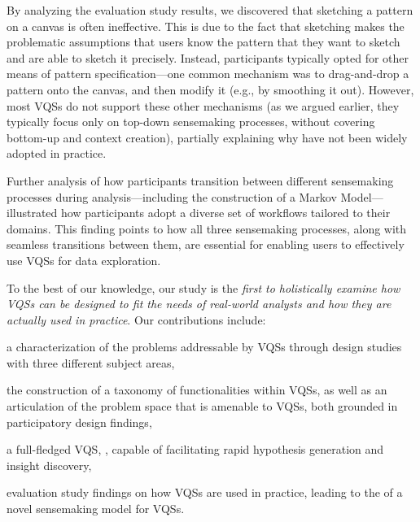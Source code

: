 \par By analyzing the evaluation study results, we discovered that sketching a pattern on a canvas is often ineffective. This is due to the fact that sketching makes the problematic assumptions that users know the pattern that they want to sketch and are able to sketch it precisely. Instead, participants typically opted for other means of pattern specification---one common mechanism was to drag-and-drop a  pattern onto the canvas, and then modify it (e.g., by smoothing it out). However, most VQSs do not support these other mechanisms (as we argued earlier, they typically focus only on top-down sensemaking processes, without covering bottom-up and context creation), partially explaining why  have not been widely adopted in practice.
\par Further analysis of how participants
transition between different sensemaking processes
during analysis---including the construction of a Markov Model---illustrated
how participants adopt a diverse set of workflows tailored
to their domains. %
This finding points to how all three sensemaking processes, along with seamless transitions between them, are essential for enabling users to effectively use VQSs for data exploration. 
\par To the best of our knowledge, our study is the \emph{first to holistically examine how VQSs can be designed to fit the needs of real-world 
analysts and how they are actually used in practice}. Our contributions include: 
\begin{denselist}
\item a characterization of the problems addressable by VQSs through design studies with three different subject areas,
\item the construction of a taxonomy of functionalities within VQSs, as well as an articulation of the problem space that is amenable to VQSs, both grounded in participatory design findings,
\item a full-fledged VQS, \zvpp, capable of facilitating rapid hypothesis generation and insight discovery,
\item evaluation study findings on how VQSs are used in practice, leading to the  of a novel sensemaking model for VQSs. %
\end{denselist}

